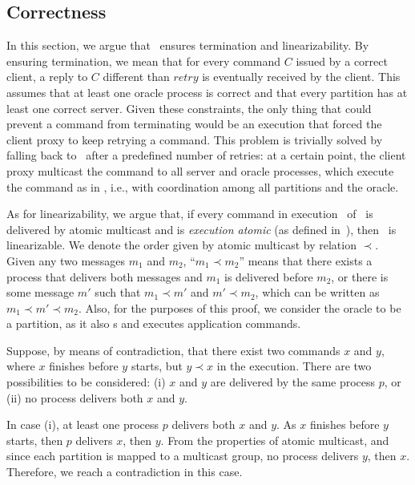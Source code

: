 \subsection{Correctness}
\label{sec:dssmr-correctness}

In this section, we argue that \dssmr\ ensures termination and linearizability.
By ensuring termination, we mean that for every command $C$ issued by a correct
client, a reply to $C$ different than $retry$ is eventually received by the
client. This assumes that at least one oracle process is correct and that every
partition has at least one correct server. Given these constraints, the only
thing that could prevent a command from terminating would be an execution that
forced the client proxy to keep retrying a command. This problem is trivially
solved by falling back to \ssmr\ after a predefined number of retries: at a
certain point, the client proxy multicast the command to all server and oracle
processes, which execute the command as in \ssmr{}, i.e., with coordination
among all partitions and the oracle.

As for linearizability, we argue that, if every command in execution \ex\ of
\dssmr\ is delivered by atomic multicast and is \emph{execution atomic} (as
defined in~\cite{bezerra2014ssmr}), then \ex\ is linearizable. We denote the
order given by atomic multicast by relation $\prec$. Given any two messages
$m_1$ and $m_2$, ``$m_1 \prec m_2$'' means that there exists a process that
delivers both messages and $m_1$ is delivered before $m_2$, or there is some
message $m'$ such that $m_1 \prec m'$ and $m' \prec m_2$, which can be written
as \mbox{$m_1 \prec m' \prec m_2$}.
Also, for the purposes of this proof, we consider the oracle to be a partition,
as it also \amdel{}s and executes application commands.

Suppose, by means of contradiction, that there exist two commands $x$ and $y$,
where $x$ finishes before $y$ starts, but $y \prec x$ in the execution. There
are two possibilities to be considered: (i) $x$ and $y$ are delivered by the
same process $p$, or (ii) no process delivers both $x$ and $y$.

In case (i), at least one process $p$ delivers both $x$ and $y$. As $x$ finishes
before $y$ starts, then $p$ delivers $x$, then $y$. From the properties of
atomic multicast, and since each partition is mapped to a multicast group, no
process delivers $y$, then $x$. Therefore, we reach a contradiction in this
case.

